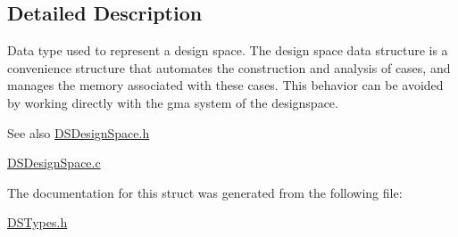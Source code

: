 \subsection{Detailed Description}
Data type used to represent a design space. The design space data structure is a convenience structure that automates the construction and analysis of cases, and manages the memory associated with these cases. This behavior can be avoided by working directly with the gma system of the designspace.

\begin{DoxySeeAlso}{See also}
\hyperlink{_d_s_design_space_8h}{DSDesignSpace.h} 

\hyperlink{_d_s_design_space_8c}{DSDesignSpace.c} 
\end{DoxySeeAlso}


The documentation for this struct was generated from the following file:\begin{DoxyCompactItemize}
\item 
\hyperlink{_d_s_types_8h}{DSTypes.h}\end{DoxyCompactItemize}
